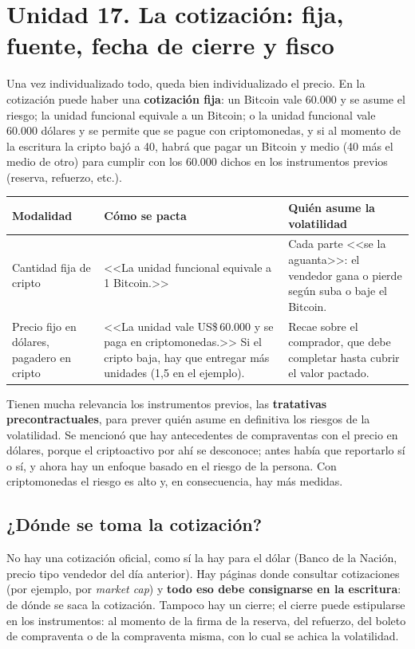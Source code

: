 \documentclass[12pt,oneside,a4paper]{book}
\begin{document}
\section{Unidad 17. La cotización: fija, fuente, fecha de cierre y fisco}

Una vez individualizado todo, queda bien individualizado el precio. En la cotización puede haber una \textbf{cotización fija}: un Bitcoin vale 60.000 y se asume el riesgo; la unidad funcional equivale a un Bitcoin; o la unidad funcional vale 60.000 dólares y se permite que se pague con criptomonedas, y si al momento de la escritura la cripto bajó a 40, habrá que pagar un Bitcoin y medio (40 más el medio de otro) para cumplir con los 60.000 dichos en los instrumentos previos (reserva, refuerzo, etc.).

\begin{longtable}{@{}>{\RaggedRight\arraybackslash}p{}>{\RaggedRight\arraybackslash}p{}>{\RaggedRight\arraybackslash}p{}@{}}
\toprule
\textbf{Modalidad} & \textbf{Cómo se pacta} & \textbf{Quién asume la volatilidad} \\
\midrule
\endhead
Cantidad fija de cripto &
<<La unidad funcional equivale a 1 Bitcoin.>> &
Cada parte <<se la aguanta>>: el vendedor gana o pierde según suba o baje el Bitcoin. \\
\addlinespace
Precio fijo en dólares, pagadero en cripto &
<<La unidad vale US\$\,60.000 y se paga en criptomonedas.>> Si el cripto baja, hay que entregar más unidades (1,5 en el ejemplo). &
Recae sobre el comprador, que debe completar hasta cubrir el valor pactado. \\
\bottomrule
\end{longtable}

Tienen mucha relevancia los instrumentos previos, las \textbf{tratativas precontractuales}, para prever quién asume en definitiva los riesgos de la volatilidad. Se mencionó que hay antecedentes de compraventas con el precio en dólares, porque el criptoactivo por ahí se desconoce; antes había que reportarlo sí o sí, y ahora hay un enfoque basado en el riesgo de la persona. Con criptomonedas el riesgo es alto y, en consecuencia, hay más medidas.

\subsection{¿Dónde se toma la cotización?}

No hay una cotización oficial, como sí la hay para el dólar (Banco de la Nación, precio tipo vendedor del día anterior). Hay páginas donde consultar cotizaciones (por ejemplo, por \emph{market cap}) y \textbf{todo eso debe consignarse en la escritura}: de dónde se saca la cotización. Tampoco hay un cierre; el cierre puede estipularse en los instrumentos: al momento de la firma de la reserva, del refuerzo, del boleto de compraventa o de la compraventa misma, con lo cual se achica la volatilidad.
\end{document}
